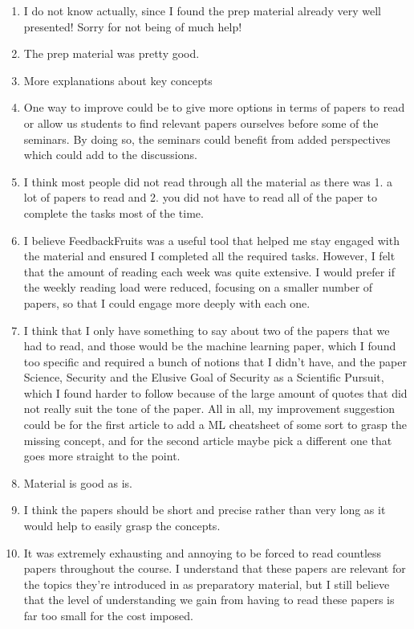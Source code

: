 \documentclass[a4paper]{report}
\begin{document}
\begin{enumerate}
  \item I do not know actually, since I found the prep material already very well presented! Sorry for not being of much help!
  \item The prep material was pretty good. 
  \item More explanations about key concepts
  \item One way to improve could be to give more options in terms of papers to read or allow us students to find relevant papers ourselves before some of the seminars. By doing so, the seminars could benefit from added perspectives which could add to the discussions.
  \item I think most people did not read through all the material as there was 1. a lot of papers to read and 2. you did not have to read all of the paper to complete the tasks most of the time.
  \item I believe FeedbackFruits was a useful tool that helped me stay engaged with the material and ensured I completed all the required tasks. However, I felt that the amount of reading each week was quite extensive. I would prefer if the weekly reading load were reduced, focusing on a smaller number of papers, so that I could engage more deeply with each one.
  \item I think that I only have something to say about two of the papers that we had to read, and those would be the machine learning paper, which I found too specific and required a bunch of notions that I didn't have, and the paper Science, Security and the Elusive Goal of Security as a Scientific Pursuit, which I found harder to follow because of the large amount of quotes that did not really suit the tone of the paper. All in all, my improvement suggestion could be for the first article to add a ML cheatsheet of some sort to grasp the missing concept, and for the second article maybe pick a different one that goes more straight to the point.
  \item Material is good as is.
  \item I think the papers should be short and precise rather than very long as it would help to easily grasp the concepts.
  \item It was extremely exhausting and annoying to be forced to read countless papers throughout the course. I understand that these papers are relevant for the topics they're introduced in as preparatory material, but I still believe that the level of understanding we gain from having to read these papers is far too small for the cost imposed.

\end{enumerate}
\end{document}
